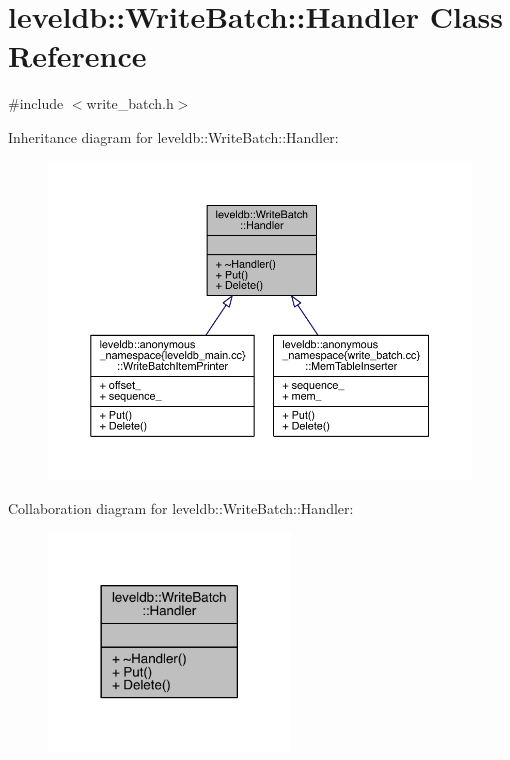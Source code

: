 \hypertarget{classleveldb_1_1_write_batch_1_1_handler}{}\section{leveldb\+:\+:Write\+Batch\+:\+:Handler Class Reference}
\label{classleveldb_1_1_write_batch_1_1_handler}


{\ttfamily \#include $<$write\+\_\+batch.\+h$>$}



Inheritance diagram for leveldb\+:\+:Write\+Batch\+:\+:Handler\+:
\nopagebreak
\begin{figure}[H]
\begin{center}
\leavevmode
\includegraphics[width=350pt]{classleveldb_1_1_write_batch_1_1_handler__inherit__graph}
\end{center}
\end{figure}


Collaboration diagram for leveldb\+:\+:Write\+Batch\+:\+:Handler\+:\nopagebreak
\begin{figure}[H]
\begin{center}
\leavevmode
\includegraphics[width=182pt]{classleveldb_1_1_write_batch_1_1_handler__coll__graph}
\end{center}
\end{figure}
